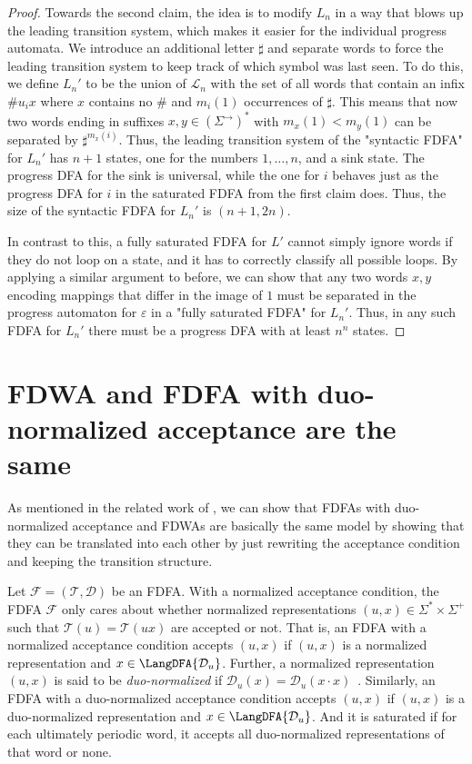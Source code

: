 \documentclass[a4paper,USenglish,cleveref,autoref,thm-restate]{lipics-v2021}
\newcommand{\mc}[1]{\ensuremath{\mathcal{#1}}}
\newcommand{\T}{\mc{T}}
\newcommand{\F}{\mc{F}}
\newcommand{\D}{\mc{D}}
\renewcommand{\L}{\mc{L}}
\newcommand{\eps}{\ensuremath{\varepsilon}}
\begin{document}
{\begin{proof}
Towards the second claim, the idea is to modify $L_n$ in a way that blows up the leading transition system, which makes it easier for the individual progress automata.
We introduce an additional letter $\sharp$ and separate words to force the leading transition system to keep track of which symbol was last seen.
To do this, we define $L_n'$ to be the union of $\L_n$ with the set of all words that contain an infix $\#u_ix$ where $x$ contains no $\#$ and $m_i(1)$ occurrences of $\sharp$.
This means that now two words ending in suffixes $x, y \in (\Sigma^\to)^*$ with $m_x(1) < m_y(1)$ can be separated by $\sharp^{m_x(i)}$.
Thus, the leading transition system of the "syntactic FDFA" for $L_n'$ has $n+1$ states, one for the numbers $1,\dots,n$, and a sink state.
The progress DFA for the sink is universal, while the one for $i$ behaves just as the progress DFA for $i$ in the saturated FDFA from the first claim does.
Thus, the size of the syntactic FDFA for $L_n'$ is $(n+1, 2n)$.

In contrast to this, a fully saturated FDFA for $L'$ cannot simply ignore words if they do not loop on a state, and it has to correctly classify all possible loops.
By applying a similar argument to before, we can show that any two words $x,y$ encoding mappings that differ in the image of $1$ must be separated in the progress automaton for $\eps$ in a "fully saturated FDFA" for $L_n'$.
Thus, in any such FDFA for $L_n'$ there must be a progress DFA with at least $n^n$ states.
\end{proof} 
\section{FDWA and FDFA with duo-normalized acceptance are the same}\label{section:appendix-duo-normal}
As mentioned in the related work of , we can show that FDFAs with duo-normalized acceptance and FDWAs are basically the same model by showing that they can be translated into each other by just rewriting the acceptance condition and keeping the transition structure.

Let $\F = (\T, \D)$ be an FDFA.
With a normalized acceptance condition, the FDFA $\F$ only cares about whether normalized representations $(u, x) \in \Sigma^*\times \Sigma^+$ such that $\T(u) = \T(ux)$ are accepted or not.
That is, an FDFA with a normalized acceptance condition accepts $(u, x)$ if $(u, x)$ is a normalized representation and $x \in \LangDFA{\D_u}$.
Further, a normalized representation $(u, x)$ is said to be \emph{duo-normalized} if $\D_u(x) = \D_u(x\cdot x)$~\cite{FismanGZ24}.
Similarly, an FDFA with a duo-normalized acceptance condition accepts $(u, x)$ if $(u, x)$ is a duo-normalized representation and $x \in \LangDFA{\D_u}$. And it is saturated if for each ultimately periodic word, it accepts all duo-normalized representations of that word or none. 

}
\end{document}
